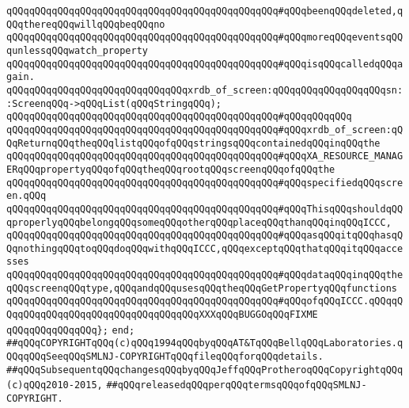 \verb|qQQqqQQqqQQqqQQqqQQqqQQqqQQqqQQqqQQqqQQqqQQqqQQq#qQQqbeenqQQqdeleted,qQQqthereqQQqwillqQQqbeqQQqno|\newline
\verb|qQQqqQQqqQQqqQQqqQQqqQQqqQQqqQQqqQQqqQQqqQQqqQQq#qQQqmoreqQQqeventsqQQqunlessqQQqwatch_property|\newline
\verb|qQQqqQQqqQQqqQQqqQQqqQQqqQQqqQQqqQQqqQQqqQQqqQQq#qQQqisqQQqcalledqQQqagain.|\newline
\newline
\newline
\newline
\newline
\verb|qQQqqQQqqQQqqQQqqQQqqQQqqQQqqQQqxrdb_of_screen:qQQqqQQqqQQqqQQqqQQqsn::ScreenqQQq->qQQqList(qQQqStringqQQq);|\newline
\verb|qQQqqQQqqQQqqQQqqQQqqQQqqQQqqQQqqQQqqQQqqQQqqQQq#qQQqqQQqqQQq|\newline
\verb|qQQqqQQqqQQqqQQqqQQqqQQqqQQqqQQqqQQqqQQqqQQqqQQq#qQQqxrdb_of_screen:qQQqReturnqQQqtheqQQqlistqQQqofqQQqstringsqQQqcontainedqQQqinqQQqthe|\newline
\verb|qQQqqQQqqQQqqQQqqQQqqQQqqQQqqQQqqQQqqQQqqQQqqQQq#qQQqXA_RESOURCE_MANAGERqQQqpropertyqQQqofqQQqtheqQQqrootqQQqscreenqQQqofqQQqthe|\newline
\verb|qQQqqQQqqQQqqQQqqQQqqQQqqQQqqQQqqQQqqQQqqQQqqQQq#qQQqspecifiedqQQqscreen.qQQq|\newline
\verb|qQQqqQQqqQQqqQQqqQQqqQQqqQQqqQQqqQQqqQQqqQQqqQQq#qQQqThisqQQqshouldqQQqproperlyqQQqbelongqQQqsomeqQQqotherqQQqplaceqQQqthanqQQqinqQQqICCC,|\newline
\verb|qQQqqQQqqQQqqQQqqQQqqQQqqQQqqQQqqQQqqQQqqQQqqQQq#qQQqasqQQqitqQQqhasqQQqnothingqQQqtoqQQqdoqQQqwithqQQqICCC,qQQqexceptqQQqthatqQQqitqQQqaccesses|\newline
\verb|qQQqqQQqqQQqqQQqqQQqqQQqqQQqqQQqqQQqqQQqqQQqqQQq#qQQqdataqQQqinqQQqtheqQQqscreenqQQqtype,qQQqandqQQqusesqQQqtheqQQqGetPropertyqQQqfunctions|\newline
\verb|qQQqqQQqqQQqqQQqqQQqqQQqqQQqqQQqqQQqqQQqqQQqqQQq#qQQqofqQQqICCC.qQQqqQQqqQQqqQQqqQQqqQQqqQQqqQQqqQQqqQQqXXXqQQqBUGGOqQQqFIXME|\newline
\verb|qQQqqQQqqQQqqQQq};|\newline
\newline
\verb|end;|\newline
\newline
\newline
\verb|##qQQqCOPYRIGHTqQQq(c)qQQq1994qQQqbyqQQqAT&TqQQqBellqQQqLaboratories.qQQqqQQqSeeqQQqSMLNJ-COPYRIGHTqQQqfileqQQqforqQQqdetails.|\newline
\verb|##qQQqSubsequentqQQqchangesqQQqbyqQQqJeffqQQqProtheroqQQqCopyrightqQQq(c)qQQq2010-2015,|\newline
\verb|##qQQqreleasedqQQqperqQQqtermsqQQqofqQQqSMLNJ-COPYRIGHT.|\newline

